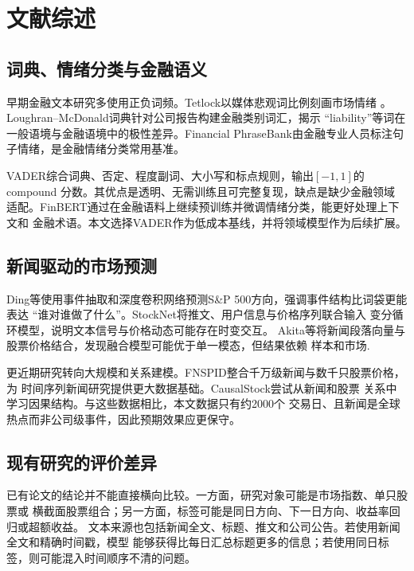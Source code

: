\documentclass[UTF8,a4paper,10pt,twocolumn,fontset=none]{ctexart}
\begin{document}
\section{文献综述}

\subsection{词典、情绪分类与金融语义}

早期金融文本研究多使用正负词频。Tetlock以媒体悲观词比例刻画市场情绪
\cite{tetlock}。Loughran--McDonald词典针对公司报告构建金融类别词汇，揭示
“liability”等词在一般语境与金融语境中的极性差异\cite{lm}。Financial
PhraseBank由金融专业人员标注句子情绪，是金融情绪分类常用基准\cite{phrasebank}。

VADER综合词典、否定、程度副词、大小写和标点规则，输出$[-1,1]$的compound
分数\cite{vader}。其优点是透明、无需训练且可完整复现，缺点是缺少金融领域
适配。FinBERT通过在金融语料上继续预训练并微调情绪分类，能更好处理上下文和
金融术语\cite{finbert}。本文选择VADER作为低成本基线，并将领域模型作为后续扩展。

\subsection{新闻驱动的市场预测}

Ding等使用事件抽取和深度卷积网络预测S\&P 500方向，强调事件结构比词袋更能表达
“谁对谁做了什么”\cite{ding2015}。StockNet将推文、用户信息与价格序列联合输入
变分循环模型，说明文本信号与价格动态可能存在时变交互\cite{stocknet}。
Akita等将新闻段落向量与股票价格结合，发现融合模型可能优于单一模态，但结果依赖
样本和市场\cite{akita}.

更近期研究转向大规模和关系建模。FNSPID整合千万级新闻与数千只股票价格，为
时间序列新闻研究提供更大数据基础\cite{fnspid}。CausalStock尝试从新闻和股票
关系中学习因果结构\cite{causalstock}。与这些数据相比，本文数据只有约2000个
交易日、且新闻是全球热点而非公司级事件，因此预期效果应更保守。

\subsection{现有研究的评价差异}

已有论文的结论并不能直接横向比较。一方面，研究对象可能是市场指数、单只股票或
横截面股票组合；另一方面，标签可能是同日方向、下一日方向、收益率回归或超额收益。
文本来源也包括新闻全文、标题、推文和公司公告。若使用新闻全文和精确时间戳，模型
能够获得比每日汇总标题更多的信息；若使用同日标签，则可能混入时间顺序不清的问题。
\end{document}
